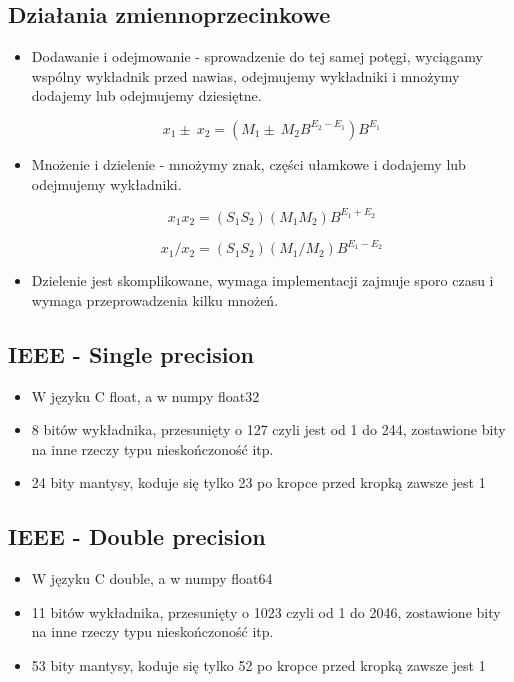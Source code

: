 \documentclass[a4paper]{article}
\begin{document}
\subsection{Działania zmiennoprzecinkowe}
\begin{itemize}
    \item Dodawanie i odejmowanie - sprowadzenie do tej samej potęgi, wyciągamy wspólny wykładnik przed nawias, odejmujemy wykładniki i mnożymy dodajemy lub odejmujemy dziesiętne.
    
    \begin{equation*}
        x_1\pm\ x_2=(M_1\pm\ M_2 B^{E_2-E_1})B^{E_1}
    \end{equation*}
    
    \item Mnożenie i dzielenie - mnożymy znak, części ułamkowe i dodajemy lub odejmujemy wykładniki.
    
    \begin{equation*}
        x_1 x_2=(S_1 S_2)(M_1 M_2)B^{E_1+E_2}
    \end{equation*}
    
    \begin{equation*}
        x_1/x_2=(S_1 S_2)(M_1/M_2) B^{E_1-E_2}
    \end{equation*}
    
    \item Dzielenie jest skomplikowane, wymaga implementacji zajmuje sporo czasu i wymaga przeprowadzenia kilku mnożeń.
\end{itemize}

\subsection{IEEE - Single precision}
\begin{itemize}
    \item W języku C float, a w numpy float32
    \item 8 bitów wykładnika, przesunięty o 127 czyli jest od 1 do 244, zostawione bity na inne rzeczy typu nieskończoność itp.
    \item 24 bity mantysy, koduje się tylko 23 po kropce przed kropką zawsze jest 1
\end{itemize}

\subsection{IEEE - Double precision}
\begin{itemize}
    \item W języku C double, a w numpy float64
    \item 11 bitów wykładnika, przesunięty o 1023 czyli od 1 do 2046, zostawione bity na inne rzeczy typu nieskończoność itp.
    \item 53 bity mantysy, koduje się tylko 52 po kropce przed kropką zawsze jest 1
\end{itemize}
\end{document}
